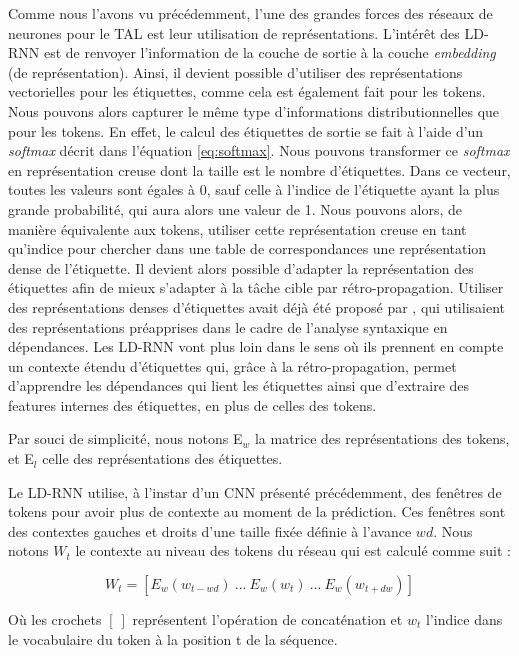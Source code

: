 \documentclass[12pt,a4paper,times,twoside,openright]{report}
\begin{document}
Comme nous l'avons vu précédemment, l'une des grandes forces des réseaux de neurones pour le TAL est leur utilisation de représentations. L'intérêt des LD-RNN est de renvoyer l'information de la couche de sortie à la couche \textit{embedding} (de représentation). Ainsi, il devient possible d'utiliser des représentations vectorielles pour les étiquettes, comme cela est également fait pour les tokens. Nous pouvons alors capturer le même type d'informations distributionnelles que pour les tokens. En effet, le calcul des étiquettes de sortie se fait à l'aide d'un \textit{softmax} décrit dans l'équation \ref{eq:softmax}. Nous pouvons transformer ce \textit{softmax} en représentation creuse dont la taille est le nombre d'étiquettes. Dans ce vecteur, toutes les valeurs sont égales à 0, sauf celle à l'indice de l'étiquette ayant la plus grande probabilité, qui aura alors une valeur de 1. Nous pouvons alors, de manière équivalente aux tokens, utiliser cette représentation creuse en tant qu'indice pour chercher dans une table de correspondances une représentation dense de l'étiquette. Il devient alors possible d'adapter la représentation des étiquettes afin de mieux s'adapter à la tâche cible par rétro-propagation. Utiliser des représentations denses d'étiquettes avait déjà été proposé par \citet{chen2014fast}, qui utilisaient des représentations préapprises dans le cadre de l'analyse syntaxique en dépendances. Les LD-RNN vont plus loin dans le sens où ils prennent en compte un contexte étendu d'étiquettes qui, grâce à la rétro-propagation, permet d'apprendre les dépendances qui lient les étiquettes ainsi que d'extraire des features internes des étiquettes, en plus de celles des tokens.

Par souci de simplicité, nous notons E$_{w}$ la matrice des représentations des tokens, et E$_{l}$ celle des représentations des étiquettes.

Le LD-RNN utilise, à l'instar d'un CNN présenté précédemment, des fenêtres de tokens pour avoir plus de contexte au moment de la prédiction. Ces fenêtres sont des contextes gauches et droits d'une taille fixée définie à l'avance $wd$. Nous notons $W_{t}$ le contexte au niveau des tokens du réseau qui est calculé comme suit :

\begin{equation}\label{eq:LD-RNN-word-window}
W_{t} = \left[ E_{w}(w_{t-wd})\ ...\ E_{w}(w_{t})\ ...\ E_{w}(w_{t+dw}) \right]
\end{equation}

Où les crochets $[\ ]$ représentent l'opération de concaténation et $w_{t}$ l'indice dans le vocabulaire du token à la position t de la séquence.
\end{document}
